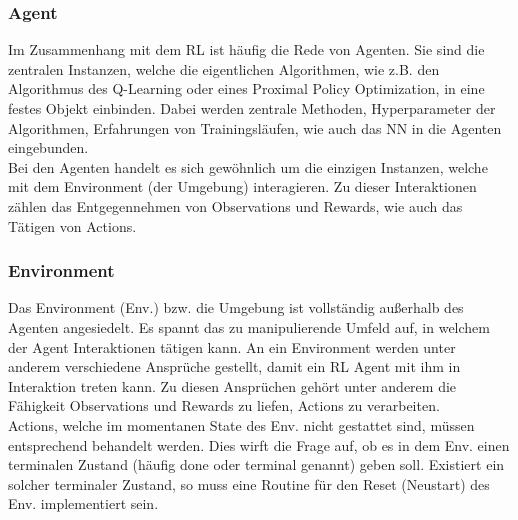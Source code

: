 \subsubsection{Agent}\label{sec:Agent}
Im Zusammenhang mit dem RL ist häufig die Rede von Agenten. Sie sind die zentralen Instanzen, welche die eigentlichen Algorithmen, wie z.B. den Algorithmus des Q-Learning oder eines Proximal Policy Optimization, in eine festes Objekt einbinden. Dabei werden zentrale Methoden, Hyperparameter der Algorithmen, Erfahrungen von Trainingsläufen, wie auch das NN in die Agenten eingebunden. \cite[S. 31]{DRL_Lapan}\\
Bei den Agenten handelt es sich gewöhnlich um die einzigen Instanzen, welche mit dem Environment (der Umgebung) interagieren. Zu dieser Interaktionen zählen das Entgegennehmen von Observations und Rewards, wie auch das Tätigen von Actions. \cite[S. 2ff.]{Sutton1998}

\subsubsection{Environment}\label{sec:Environment}
Das Environment (Env.) bzw. die  Umgebung ist vollständig außerhalb des Agenten angesiedelt. Es spannt das zu manipulierende Umfeld auf, in welchem der Agent Interaktionen tätigen kann. An ein Environment werden unter anderem verschiedene Ansprüche gestellt, damit ein RL Agent mit ihm in Interaktion treten kann. Zu diesen Ansprüchen gehört unter anderem die Fähigkeit Observations und Rewards zu liefen, Actions zu verarbeiten. \cite[S. 31 \& S.2 ff.]{DRL_Lapan, Sutton1998}\\
Actions, welche im momentanen State des Env. nicht gestattet sind, müssen entsprechend behandelt werden. 
Dies wirft die Frage auf, ob es in dem Env. einen terminalen Zustand (häufig done oder terminal genannt) geben soll. Existiert ein solcher terminaler Zustand, so muss eine Routine für den Reset (Neustart) des Env. implementiert sein.

